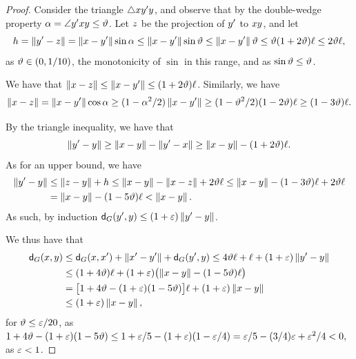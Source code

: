 \documentclass[12pt]{article}%
\begin{document}
\begin{proof}
    Consider the triangle $\triangle x y' y$, and observe that
    by the double-wedge property
    $\alpha = \angle y' x y \leq \vartheta$.  Let $z$ be the
    projection of $y'$ to $x y$, and let
    \begin{equation*}
        h%
        =%
        \dY{\py'}{ \pz}%
        =%
        \dY{\px}{\py'} \sin \alpha
        \leq
        \dY{\px}{\py'} \sin \epsA
        \leq%
        \dY{\px}{\py'}  \epsA
        \leq%
        \epsA (1+2 \epsA)\ell
        \leq 
        2 \epsA \ell,
    \end{equation*}
    as $\vartheta \in (0,1/10)$, the monotonicity of $\sin$ in this range,
    and as $\sin \vartheta \leq \vartheta$.
    
    We have that
    $\left\| x - z \right\| \leq \left\| x - y' \right\| \leq
    (1+2\vartheta)\ell$. Similarly, we have
    \begin{equation*}
        \dY{\px}{\pz}%
        =%
        \dY{\px}{\py'} \cos \alpha
        \geq%
        (1-\alpha^2/2)\dY{\px}{\py'} 
        \geq 
        (1-\epsA^2/2)(1-2\epsA)\ell
        \geq
        (1-3\epsA)\ell.
    \end{equation*}


    By the triangle inequality, we have that
    \begin{equation*}
        \dY{\py'}{\py}
        \geq%
        \dY{\px}{\py}
        -\dY{\py'}{\px}        
        \geq%
        \dY{\px}{\py}
        - (1+2\epsA)\ell.
    \end{equation*}
    As for an upper bound, we have
    \begin{align*}
      \dY{\py'}{\py}
      &\leq%
        \dY{\pz}{\py} + h%
        \leq%
        \dY{\px}{\py} - \dY{\px}{\pz} +
        2 \epsA \ell
        \leq
        \dY{\px}{\py} - (1-3\epsA)\ell 
        +2 \epsA \ell
      \\&
      = 
      \dY{\px}{\py} - (1-5\epsA)\ell 
      <%
      \dY{\px}{\py}.
    \end{align*}
    As such, by induction
    $\dGZ{\G}{\py'}{\py} \leq (1+\eps) \dY{\py'}{\py}$.

    We thus have that
    \begin{align*}
      \dGZ{\G}{\px}{\py}%
      &\leq%
        \dGZ{\G}{\px}{\px'} + \dY{\px'}{\py'}
        +
        \dGZ{\G}{\py'}{\py}%
        \leq%
        4\epsA \ell
        +
        \ell
        +
        (1+\eps) \dY{\py'}{\py}
      \\&
      \leq%
      (1+4\epsA) \ell
      +
      (1+\eps) \pth{\bigl.
      \dY{\px}{\py} - (1-5\epsA)\ell }
      \\&
      =%
      \bigl[1+4\epsA
      - (1+\eps)(1-5\epsA)\bigr]\ell 
      +
      (1+\eps)
      \dY{\px}{\py}%
      \\&
      \leq%
      (1+\eps)
      \dY{\px}{\py},
    \end{align*}
    for $\vartheta \leq \varepsilon/20$, as
    \begin{math}
        1+4\epsA - (1+\eps)(1-5\epsA)%
        \leq%
        1+\eps/5 - (1+\eps)(1-\eps/4)%
        =%
        \eps/5 -(3/4)\eps + \eps^2/4 < 0,
    \end{math}
    as $\varepsilon < 1$.
\end{proof}
\end{document}
